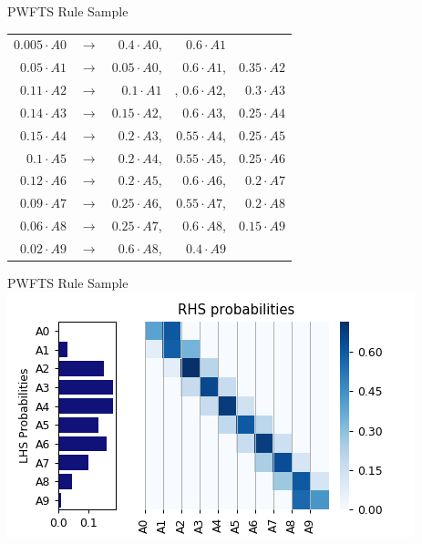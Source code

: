 \documentclass{beamer}
\begin{document}
\begin{frame}{PWFTS Rule Sample}
    \centering
    \begin{tabular}{rcrrr}
        $0.005\cdot A0$ & $\rightarrow$ & $0.4\cdot A0$, & $0.6\cdot A1$ &   \\
        $0.05\cdot A1$ & $\rightarrow$ & $0.05\cdot A0$, & $0.6\cdot A1$, & $0.35\cdot A2$  \\
        $0.11\cdot A2$ & $\rightarrow$ & $0.1\cdot A1$&,  $0.6\cdot A2$, & $0.3\cdot A3$  \\
        $0.14\cdot A3$ & $\rightarrow$ & $0.15\cdot A2$, & $0.6\cdot A3$, & $0.25\cdot A4$  \\
        $0.15\cdot A4$ & $\rightarrow$ & $0.2\cdot A3$, & $0.55\cdot A4$, & $0.25\cdot A5$  \\
        $0.1\cdot A5$ & $\rightarrow$ & $0.2\cdot A4$, & $0.55\cdot A5$, & $0.25\cdot A6$  \\
        $0.12\cdot A6$ & $\rightarrow$ & $0.2\cdot A5$, & $0.6\cdot A6$, & $0.2\cdot A7$  \\
        $0.09\cdot A7$ & $\rightarrow$ & $0.25\cdot A6$, & $0.55\cdot A7$, & $0.2\cdot A8$  \\
        $0.06\cdot A8$ & $\rightarrow$ & $0.25\cdot A7$, & $0.6\cdot A8$, & $0.15\cdot A9$  \\
        $0.02\cdot A9$ & $\rightarrow$ & $0.6\cdot A8$, & $0.4\cdot A9$ &   \\
    \end{tabular}
\end{frame}


\begin{frame}{PWFTS Rule Sample}
\includegraphics[width=\textwidth]{figures/pwfts_rules_firstorder.png}
\end{frame}
\end{document}
